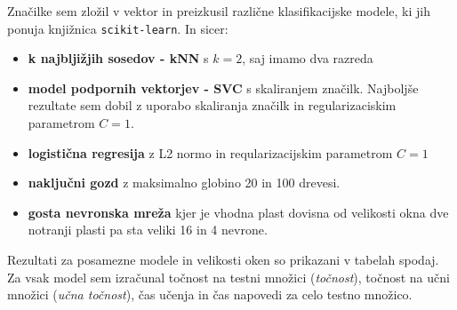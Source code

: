 \documentclass[11pt,a4paper]{article}
\begin{document}
Značilke sem zložil v vektor in preizkusil različne klasifikacijske modele, ki jih ponuja knjižnica \texttt{scikit-learn}. In sicer:
\begin{itemize}
    \item \textbf{k najbljižjih sosedov - kNN} s $k=2$, saj imamo dva razreda  
    \item \textbf{model podpornih vektorjev - SVC} s skaliranjem značilk. Najboljše rezultate sem dobil z uporabo skaliranja značilk in regularizaciskim parametrom $C=1$.
    \item \textbf{logistična regresija} z L2 normo in reqularizacijskim parametrom $C=1$
    \item \textbf{naključni gozd} z maksimalno globino 20 in 100 drevesi.
    \item \textbf{gosta nevronska mreža} kjer je vhodna plast dovisna od velikosti okna dve notranji plasti pa sta veliki 16 in 4 nevrone.
\end{itemize}

Rezultati za posamezne modele in velikosti oken so prikazani v tabelah spodaj. Za vsak model sem izračunal točnost na testni množici (\emph{točnost}), točnost na učni množici (\emph{učna točnost}), čas učenja in čas napovedi za celo testno množico.
\end{document}
